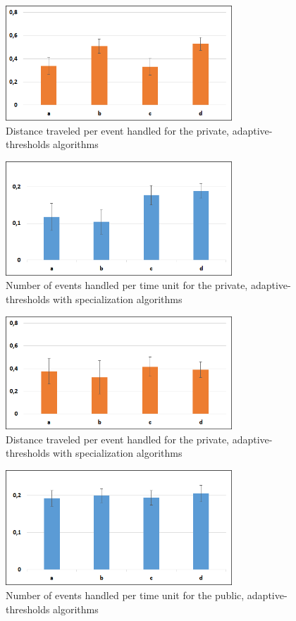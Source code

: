 	\begin{figure}[thpb]
      \centering
      \includegraphics[width=8.5cm]{Pictures/PrivAdaptMetric2.png}
      \caption{Distance traveled per event handled for the private, adaptive-thresholds algorithms}
      \label{figure4}
   \end{figure}
	\begin{figure}[thpb]
      \centering
      \includegraphics[width=8.5cm]{Pictures/PrivSpecMetric1.png}
      \caption{Number of events handled per time unit for the private, adaptive-thresholds with specialization algorithms}
      \label{figure5}
   \end{figure}
	\begin{figure}[thpb]
      \centering
      \includegraphics[width=8.5cm]{Pictures/PrivSpecMetric2.png}
      \caption{Distance traveled per event handled for the private, adaptive-thresholds with specialization algorithms}
      \label{figure6}
   \end{figure}
	\begin{figure}[thpb]
      \centering
      \includegraphics[width=8.5cm]{Pictures/PrivAdaptMetric1.png}
      \caption{Number of events handled per time unit for the public, adaptive-thresholds algorithms}
      \label{figure7}
   \end{figure}
